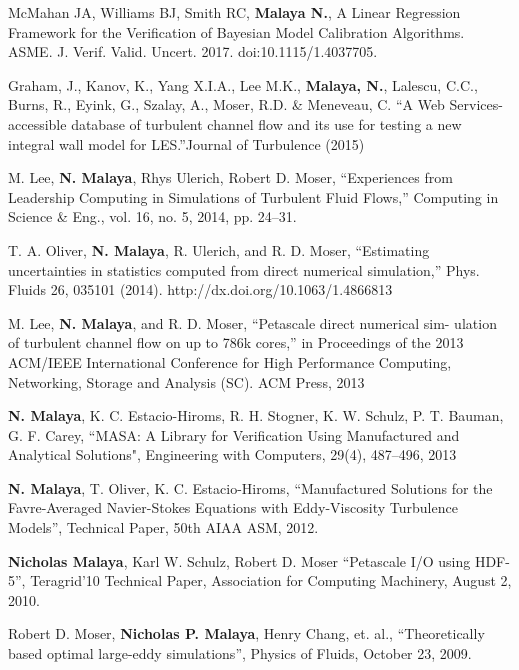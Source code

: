 %

McMahan JA, Williams BJ, Smith RC, \textbf{Malaya N.}, A Linear Regression
Framework for the Verification of Bayesian Model Calibration
Algorithms. ASME. J. Verif. Valid. Uncert. 2017. doi:10.1115/1.4037705. 

\blankline

 Graham, J., Kanov, K., Yang X.I.A., Lee M.K., \textbf{Malaya, N.}, 
Lalescu, C.C., Burns, R., Eyink, G., Szalay, A., Moser, R.D. \& 
Meneveau, C. ``A Web Services-accessible database of turbulent channel
flow and its use for testing a new integral wall model for LES.''Journal
of Turbulence  (2015)

\blankline

M. Lee, \textbf{N. Malaya}, Rhys Ulerich, Robert D. Moser,  “Experiences from
Leadership Computing in Simulations of Turbulent Fluid Flows,”
Computing in Science \& Eng., vol. 16, no. 5, 2014, pp. 24–31.

\blankline

T. A. Oliver, \textbf{N. Malaya}, R. Ulerich, and R. D. Moser, “Estimating
uncertainties in statistics computed from direct numerical simulation,”
Phys. Fluids 26, 035101 (2014). http://dx.doi.org/10.1063/1.4866813 

\blankline

M. Lee, \textbf{N. Malaya}, and R. D. Moser, ``Petascale direct numerical sim-
ulation of turbulent channel flow on up to 786k cores,'' in Proceedings
of the 2013 ACM/IEEE International Conference for High Performance
Computing, Networking, Storage and Analysis (SC). ACM Press, 2013 

\blankline

\textbf{N. Malaya}, K. C. Estacio-Hiroms, R. H. Stogner, K. W. Schulz, P. T. Bauman,
G. F. Carey, ``MASA: A Library for Verification Using Manufactured and
Analytical Solutions", Engineering with Computers, 29(4), 487--496, 2013

\blankline

\textbf{N. Malaya}, T. Oliver, K. C. Estacio-Hiroms, ``Manufactured Solutions for
the Favre-Averaged Navier-Stokes Equations 
with Eddy-Viscosity Turbulence Models'', Technical Paper, 50th AIAA ASM, 2012.

\blankline

\textbf{Nicholas Malaya}, Karl W. Schulz, Robert D. Moser
``Petascale I/O using HDF-5'', Teragrid'10 Technical Paper, Association for Computing Machinery,
August 2, 2010.

\blankline

Robert D. Moser, \textbf{Nicholas P. Malaya}, Henry Chang, et. al.,
``Theoretically based optimal large-eddy simulations'', Physics of Fluids, October 23, 2009.

